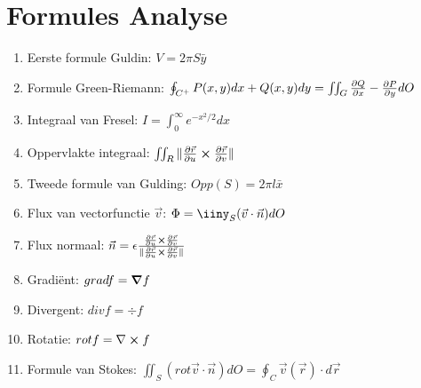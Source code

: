 \documentclass[12pt]{article}
\begin{document}
    \maketitle

    \section{Formules Analyse}
    \label{sec:formules_analyse}
   
    \begin{enumerate}
	    \item Eerste formule Guldin: $ V = 2\pi S \bar{y}$
	    \item Formule Green-Riemann: $ \oint_{C^+} P(x, y)dx + Q(x, y)dy = \iint_G \pdv{Q}{x} - \pdv{P}{y} dO $
	    \item Integraal van Fresel: $ I = \int_0^{\infty} e^{-x^2/2} dx$
    	    \item Oppervlakte integraal:  $ \iint_R \| \pdv{\vec{r}}{u} \cross \pdv{\vec{r}}{v} \| $
            \item Tweede formule van Gulding: $ Opp(S) = 2\pi l \bar{x}$
	    \item Flux van vectorfunctie $ \vec{v}$: $ \Phi = \iiny_S (\vec{v} \cdot \vec{n}) dO$
	    \item Flux normaal: $\vec{n} = \epsilon \frac{\pdv{\vec{r}}{u} \cross \pdv{\vec{r}}{v}}{\| \pdv{\vec{r}}{u} \cross \pdv{\vec{r}}{v} \| }$
	    \item Gradi\"ent: $ grad f = \grad f$
	    \item Divergent: $ div f = \div f $
	    \item Rotatie: $ rot f = \nabla \cross f $
	    \item Formule van Stokes:  $ \iint_S (rot \vec{ v}\cdot \vec{n}) dO = \oint_C \vec{v}(\vec{r}) \cdot d \vec{r} $
    \end{enumerate}
    
\end{document}
